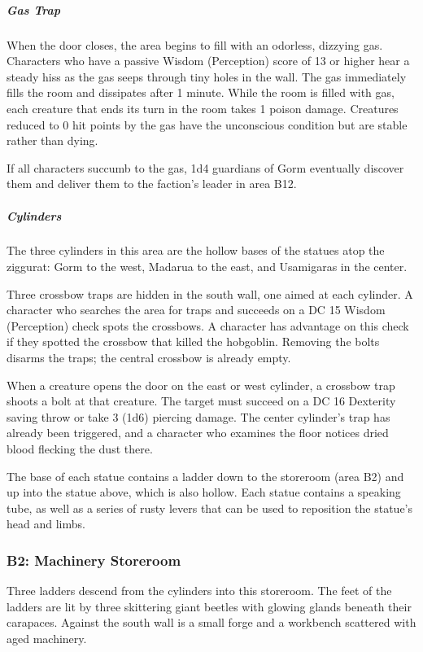 \documentclass[10pt,a4paper,twoside,bg=print,twocolumn,openany,nodeprecatedcode]{dndbook}
\begin{document}
\subparagraph{Gas Trap}
When the door closes, the area begins to fill with an odorless, dizzying gas. Characters who have a passive Wisdom (Perception) score of 13 or higher hear a steady hiss as the gas seeps through tiny holes in the wall. The gas immediately fills the room and dissipates after 1 minute. While the room is filled with gas, each creature that ends its turn in the room takes 1 poison damage. Creatures reduced to 0 hit points by the gas have the unconscious condition but are stable rather than dying.

If all characters succumb to the gas, 1d4 guardians of Gorm eventually discover them and deliver them to the faction's leader in area B12.

\subparagraph{Cylinders}
The three cylinders in this area are the hollow bases of the statues atop the ziggurat: Gorm to the west, Madarua to the east, and Usamigaras in the center.

Three crossbow traps are hidden in the south wall, one aimed at each cylinder. A character who searches the area for traps and succeeds on a DC 15 Wisdom (Perception) check spots the crossbows. A character has advantage on this check if they spotted the crossbow that killed the hobgoblin. Removing the bolts disarms the traps; the central crossbow is already empty.

When a creature opens the door on the east or west cylinder, a crossbow trap shoots a bolt at that creature. The target must succeed on a DC 16 Dexterity saving throw or take 3 (1d6) piercing damage. The center cylinder's trap has already been triggered, and a character who examines the floor notices dried blood flecking the dust there.

The base of each statue contains a ladder down to the storeroom (area B2) and up into the statue above, which is also hollow. Each statue contains a speaking tube, as well as a series of rusty levers that can be used to reposition the statue's head and limbs.

\subsubsection{B2: Machinery Storeroom}
\begin{DndReadAloud}{}
Three ladders descend from the cylinders into this storeroom. The feet of the ladders are lit by three skittering giant beetles with glowing glands beneath their carapaces. Against the south wall is a small forge and a workbench scattered with aged machinery.

\end{DndReadAloud}
\end{document}
